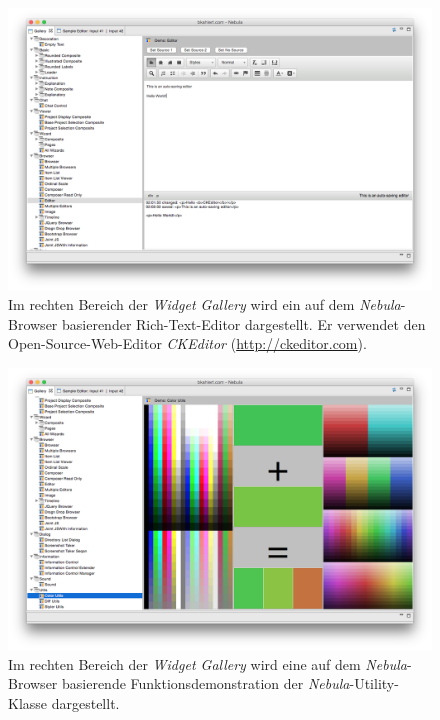 \begin{figure}
  \centering
    \includegraphics[width=1.0\linewidth]{Figures/browser/BrowserEditor.png}
  \caption[Nebula-Browser-basierter Rich-Text-Editor]{Im rechten Bereich der \textit{Widget Gallery} wird ein auf dem \textit{Nebula}-Browser basierender Rich-Text-Editor dargestellt. Er verwendet den Open-Source-Web-Editor \textit{CKEditor} (\url{http://ckeditor.com}).}
  \label{fig:BrowserEditor}
\end{figure}

\begin{figure}
  \centering
    \includegraphics[width=1.0\linewidth]{Figures/browser/BrowserColors.png}
  \caption[Nebula-Browser: Veranschaulichung einer Utility-Klasse]{Im rechten Bereich der \textit{Widget Gallery} wird eine auf dem \textit{Nebula}-Browser basierende Funktionsdemonstration der \textit{Nebula}-Utility-Klasse dargestellt.}
  \label{fig:BrowserColors}
\end{figure}



